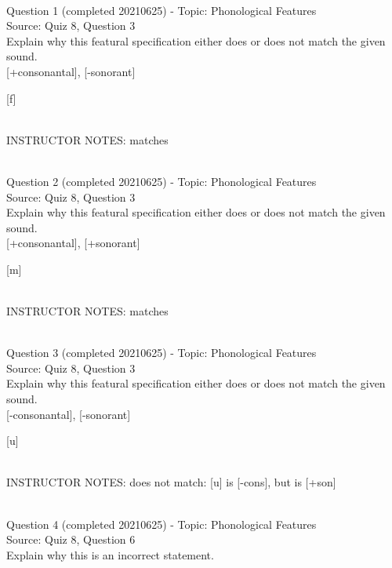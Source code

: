 \documentclass[12pt]{article}
\begin{document}
~\\

{\large Question 1} (completed 20210625) - Topic: Phonological Features\\
Source: Quiz 8, Question 3\\

Explain why this featural specification either does or does not match the given sound.\\

{[+consonantal]}, {[-sonorant]}

{[f]}


~\\
INSTRUCTOR NOTES: matches


~\\

{\large Question 2} (completed 20210625) - Topic: Phonological Features\\
Source: Quiz 8, Question 3\\

Explain why this featural specification either does or does not match the given sound.\\

{[+consonantal]}, {[+sonorant]}

{[m]}


~\\
INSTRUCTOR NOTES: matches


~\\

{\large Question 3} (completed 20210625) - Topic: Phonological Features\\
Source: Quiz 8, Question 3\\

Explain why this featural specification either does or does not match the given sound.\\

{[-consonantal]}, {[-sonorant]}

{[u]}


~\\
INSTRUCTOR NOTES: does not match: [u] is [-cons], but is [+son]


~\\

{\large Question 4} (completed 20210625) - Topic: Phonological Features\\
Source: Quiz 8, Question 6\\

Explain why this is an incorrect statement.\\
\end{document}
